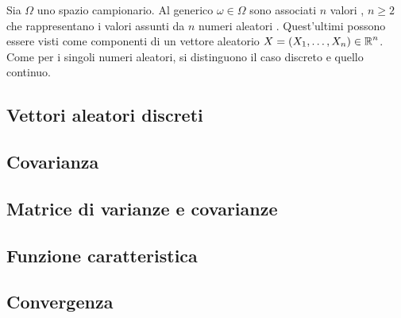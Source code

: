 \documentclass{subfiles}
\begin{document}
Sia $\Omega$ uno spazio campionario. Al generico $\omega \in \Omega$ sono associati $n$ valori ,
$n \ge 2$ che rappresentano i valori assunti da $n$ numeri aleatori .
Quest'ultimi possono essere visti come componenti di un vettore aleatorio $X = \Tuple{X}{1}{n} \in \Real^{n}$.
Come per i singoli numeri aleatori, si distinguono il caso discreto e quello continuo.

\subsection{Vettori aleatori discreti}

\clearpage

\subsection{Covarianza}


\subsection{Matrice di varianze e covarianze}

\clearpage

\subsection{Funzione caratteristica}


\subsection{Convergenza}

\end{document}
